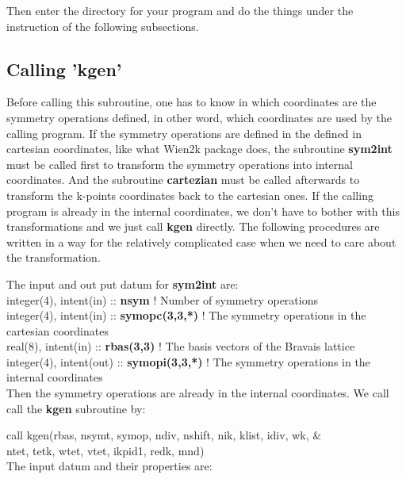 \documentclass[10pt]{article}
\begin{document}
Then enter the directory for your program and do the things under the instruction of the following subsections. \\

 
\subsection{Calling 'kgen'}

Before calling this subroutine, one has to know in which coordinates are the symmetry operations defined, in other word, which coordinates are used by the calling program. If the symmetry operations are defined in the defined in cartesian coordinates, like what Wien2k package does, the subroutine \textbf{sym2int} must be called first to transform the symmetry operations into internal coordinates. And the subroutine \textbf{cartezian} must be called afterwards to transform the k-points coordinates back to the cartesian ones. If the calling program is already in the internal coordinates, we don't have to bother with this transformations and we just call \textbf{kgen} directly. The following procedures are written in a way for the relatively complicated case when we need to care about the transformation. 

The input and out put datum for \textbf{sym2int} are:\\

integer(4), intent(in) :: \textbf{nsym}  ! Number of symmetry operations\\

integer(4), intent(in) :: \textbf{symopc(3,3,*)}  ! The symmetry operations in the cartesian coordinates\\

real(8), intent(in) :: \textbf{rbas(3,3)}  ! The basis vectors of the Bravais lattice\\

integer(4), intent(out) :: \textbf{symopi(3,3,*)}  ! The symmetry operations in the internal coordinates\\
 

Then the symmetry operations are already in the internal coordinates. We call call the \textbf{kgen} subroutine by:

call kgen(rbas, nsymt, symop, ndiv, nshift, nik, klist, idiv, wk, & \\
          ntet, tetk, wtet, vtet, ikpid1, redk, mnd)\\
          
The input datum and their properties are:\\
\end{document}
